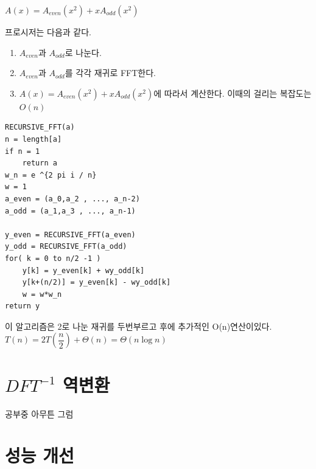 \documentclass{oblivoir}
\begin{document}
$A(x) = A_{even}(x^2) + xA_{odd}(x^2) $

프로시저는 다음과 같다.
\begin{enumerate}
    \item $A_{even}$과 $A_{odd}$로 나눈다.
    \item $A_{even}$과 $A_{odd}$를 각각 재귀로 FFT한다.
    \item $A(x) = A_{even}(x^2) + xA_{odd}(x^2) $에 따라서 계산한다. 이때의 걸리는 복잡도는 $O(n)$
\end{enumerate}


\begin{lstlisting}[style = CStyle]
RECURSIVE_FFT(a)
n = length[a]
if n = 1
    return a
w_n = e ^{2 pi i / n}
w = 1
a_even = (a_0,a_2 , ..., a_n-2)
a_odd = (a_1,a_3 , ..., a_n-1)

y_even = RECURSIVE_FFT(a_even)
y_odd = RECURSIVE_FFT(a_odd)
for( k = 0 to n/2 -1 )
    y[k] = y_even[k] + wy_odd[k]
    y[k+(n/2)] = y_even[k] - wy_odd[k]
    w = w*w_n
return y
\end{lstlisting}

이 알고리즘은 2로 나눈 재귀를 두번부르고 후에 추가적인 O(n)연산이있다.
$T(n) = 2T\left(\dfrac{n}{2}\right) + \Theta(n) = \Theta(n \log n)$

\section{$DFT^{-1}$ 역변환}
공부중 아무튼 그럼



\section{성능 개선}
\end{document}
